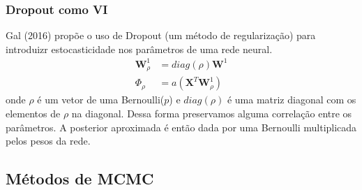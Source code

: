 \documentclass{beamer}
\begin{document}
\begin{frame}
    \frametitle{Dropout como VI}

    Gal (2016) propõe o uso de Dropout (um método de regularização) para introduizr estocasticidade nos parâmetros de uma rede neural.
    \begin{align*}
        \mathbf{W}^1_\rho &= diag(\rho)\mathbf{W}^1
        \\ \Phi_\rho &= a(\mathbf{X}^T\mathbf{W}^1_\rho)
    \end{align*}
    onde $\rho$ é um vetor de uma Bernoulli($p$) e $diag(\rho)$ é uma matriz diagonal com os elementos de $\rho$ na diagonal. Dessa forma preservamos alguma correlação entre os parâmetros.
    A posterior aproximada é então dada por uma Bernoulli multiplicada pelos pesos da rede.
\end{frame}


    

\subsection{Métodos de MCMC}
\end{document}
